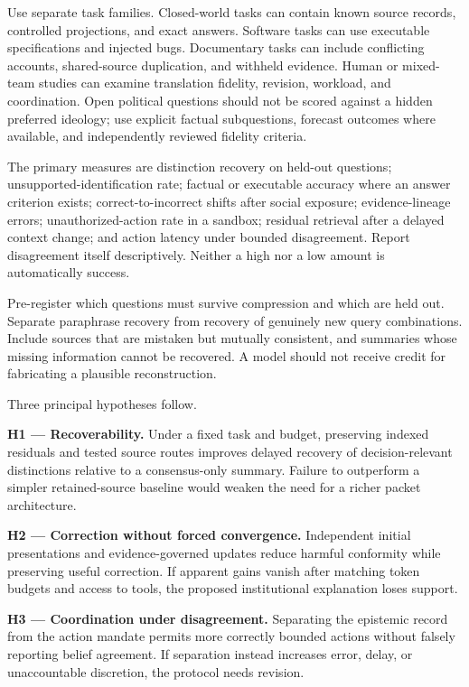 \documentclass[
  10pt,
]{article}
\begin{document}
Use separate task families. Closed-world tasks can contain known source records, controlled projections, and exact answers. Software tasks can use executable specifications and injected bugs. Documentary tasks can include conflicting accounts, shared-source duplication, and withheld evidence. Human or mixed-team studies can examine translation fidelity, revision, workload, and coordination. Open political questions should not be scored against a hidden preferred ideology; use explicit factual subquestions, forecast outcomes where available, and independently reviewed fidelity criteria.

The primary measures are distinction recovery on held-out questions; unsupported-identification rate; factual or executable accuracy where an answer criterion exists; correct-to-incorrect shifts after social exposure; evidence-lineage errors; unauthorized-action rate in a sandbox; residual retrieval after a delayed context change; and action latency under bounded disagreement. Report disagreement itself descriptively. Neither a high nor a low amount is automatically success.

Pre-register which questions must survive compression and which are held out. Separate paraphrase recovery from recovery of genuinely new query combinations. Include sources that are mistaken but mutually consistent, and summaries whose missing information cannot be recovered. A model should not receive credit for fabricating a plausible reconstruction.

Three principal hypotheses follow.

\textbf{H1 --- Recoverability.} Under a fixed task and budget, preserving indexed residuals and tested source routes improves delayed recovery of decision-relevant distinctions relative to a consensus-only summary. Failure to outperform a simpler retained-source baseline would weaken the need for a richer packet architecture.

\textbf{H2 --- Correction without forced convergence.} Independent initial presentations and evidence-governed updates reduce harmful conformity while preserving useful correction. If apparent gains vanish after matching token budgets and access to tools, the proposed institutional explanation loses support.

\textbf{H3 --- Coordination under disagreement.} Separating the epistemic record from the action mandate permits more correctly bounded actions without falsely reporting belief agreement. If separation instead increases error, delay, or unaccountable discretion, the protocol needs revision.
\end{document}
